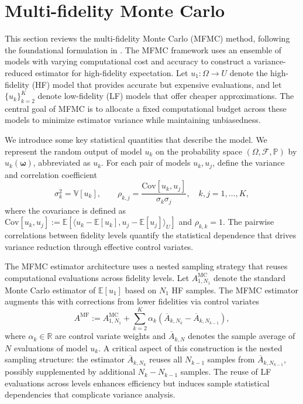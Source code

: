 \section{Multi-fidelity Monte Carlo}\label{sec:MFMC}
This section reviews the multi-fidelity Monte Carlo (MFMC) method, following the foundational formulation in \cite{PeWiGu:2016}. The MFMC framework uses an ensemble of models with varying computational cost and accuracy to construct a variance-reduced estimator for high-fidelity expectation. Let $u_1:\Omega \to U$ denote the high-fidelity (HF) model that provides accurate but expensive evaluations, and let $\{u_k\}_{k=2}^K$ denote low-fidelity (LF) models that offer cheaper approximations. The central goal of MFMC is to allocate a fixed computational budget across these models to minimize estimator variance while maintaining unbiasedness.

We introduce some key statistical quantities that describe the model. We represent the random output of model $u_k$ on the probability space $(\Omega,\mathcal{F},\mathbb{P})$ by $u_k(\boldsymbol{\omega})$, abbreviated as $u_k$. For each pair of models $u_k,u_j$, define the variance and correlation coefficient
%
\begin{equation*}
    \sigma_k^2 = \mathbb{V}\!\left[u_k\right],\qquad 
    \rho_{k,j} = \frac{\text{Cov}\!\left[u_k,u_j\right]}{\sigma_k\sigma_j}, 
    \quad k,j=1,\dots,K,
\end{equation*}
%
where the covariance is defined as $\text{Cov}[u_k,u_j] := \mathbb{E}[\langle u_k - \mathbb{E}[u_k], u_j - \mathbb{E}[u_j]\rangle_U]$ and $\rho_{k,k}=1$. The pairwise correlations between fidelity levels quantify the statistical dependence that drives variance reduction through effective control variates.

The MFMC estimator architecture uses a nested sampling strategy that reuses computational evaluations across fidelity levels. Let $A_{1,N_1}^{\text{MC}}$ denote the standard Monte Carlo estimator of $\mathbb{E}[u_1]$ based on $N_1$ HF samples. The MFMC estimator augments this with corrections from lower fidelities via control variates
%
\begin{equation}\label{eq:MFMC_estimator}
A^{\text{MF}} := A^{\text{MC}}_{1,N_1} + \sum_{k=2}^K \alpha_k\left(\overline{A}_{k,N_k} - \overline{A}_{k,N_{k-1}}\right),
\end{equation}
%
where $\alpha_k \in \mathbb{R}$ are control variate weights and $\overline{A}_{k,N}$ denotes the sample average of $N$ evaluations of model $u_k$. A critical aspect of this construction is the nested sampling structure: the estimator $\overline{A}_{k,N_{k}}$ reuses all $N_{k-1}$ samples from $\overline{A}_{k,N_{k-1}}$, possibly supplemented by additional $N_{k} - N_{k-1}$ samples. The reuse of LF evaluations across levels enhances efficiency but induces sample statistical dependencies that complicate variance analysis.



